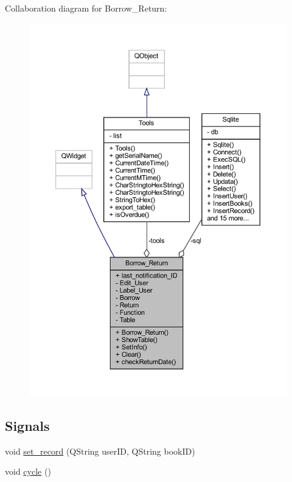 Collaboration diagram for Borrow\+\_\+\+Return\+:
\nopagebreak
\begin{figure}[H]
\begin{center}
\leavevmode
\includegraphics[width=350pt]{class_borrow___return__coll__graph}
\end{center}
\end{figure}
\subsection*{Signals}
\begin{DoxyCompactItemize}
\item 
void \mbox{\hyperlink{class_borrow___return_a8e6d3fb8c8fcab43ff158d5a0a1d7f40}{set\+\_\+record}} (Q\+String user\+ID, Q\+String book\+ID)
\item 
void \mbox{\hyperlink{class_borrow___return_a52dd74c4080e36657cf122c7c8569a89}{cycle}} ()
\end{DoxyCompactItemize}
